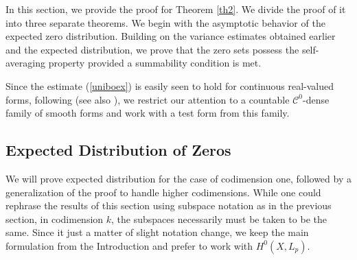 \documentclass[11pt,leqno,oneside]{amsart}
\numberwithin{equation}{section}
\begin{document}
In this section, we provide the proof for Theorem \ref{th2}. We divide the proof of it into three separate theorems. We begin with the asymptotic behavior of the expected zero distribution. Building on the variance estimates obtained earlier and the expected distribution, we prove that the zero sets possess the self-averaging property provided a summability condition is met.

Since the estimate (\ref{uniboex}) is easily seen to hold for continuous real-valued forms, following \cite{SZ99} (see also \cite{MM1}), we restrict our attention to a countable $\mathscr{C}^{0}$-dense family of smooth forms and work with a test form from this family.

\subsection{Expected Distribution of Zeros}
We will prove expected distribution for the case of codimension one, followed by a generalization of the proof to handle higher codimensions. While one could rephrase the results of this section using subspace notation as in the previous section, in codimension $k$, the subspaces necessarily must be taken to be the same. Since it just a matter of slight notation change, we keep the main formulation from the Introduction and prefer to work with $H^{0}(X, L_{p})$.
\end{document}
